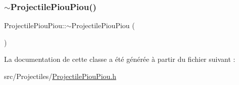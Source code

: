 \subsubsection{\texorpdfstring{$\sim$\+Projectile\+Piou\+Piou()}{~ProjectilePiouPiou()}}
{\footnotesize\ttfamily Projectile\+Piou\+Piou\+::$\sim$\+Projectile\+Piou\+Piou (\begin{DoxyParamCaption}{ }\end{DoxyParamCaption})}



La documentation de cette classe a été générée à partir du fichier suivant \+:\begin{DoxyCompactItemize}
\item 
src/\+Projectiles/\hyperlink{_projectile_piou_piou_8h}{Projectile\+Piou\+Piou.\+h}\end{DoxyCompactItemize}
